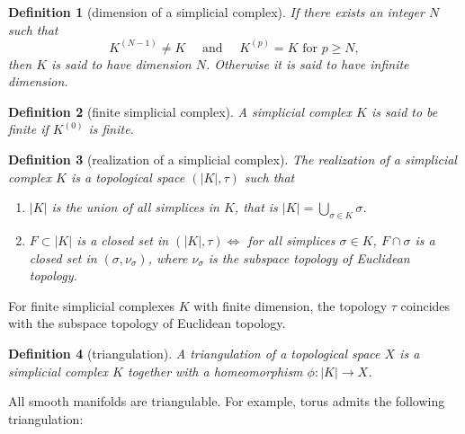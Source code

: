 \documentclass{report}
\newtheorem{definition}{Definition}[section]
\theoremstyle{nonumberplain}
\begin{document}
\begin{definition}[dimension of a simplicial complex]
If there exists an integer $N$ such that
$$
K^{(N-1)} \neq K \quad \text { and } \quad K^{(p)}=K \text { for }p\ge N ,
$$
then $K$ is said to have \emph{dimension} $N$. Otherwise it is said to have infinite dimension.
\end{definition}
\begin{definition}[finite simplicial complex]
A simplicial complex $K$ is said to be \emph{finite} if $K^{(0)}$ is finite.
\end{definition}

\begin{definition}[realization of a simplicial complex]
The realization of a simplicial complex $K$ is a topological space $(|K|, \tau)$ such that
\begin{enumerate}
	\item $|K|$ is the union of all simplices in $K$, that is $|K|=\bigcup_{\sigma\in K}\sigma$.
	\item $F\subset |K|$ is a closed set in $(|K|, \tau)\iff$ for all simplices $\sigma\in K$, $F\cap \sigma$ is a closed set in $(\sigma,\nu_\sigma)$, where $\nu_\sigma$ is the subspace topology of Euclidean topology.
\end{enumerate}
\end{definition}
For finite simplicial complexes $K$ with finite dimension, the topology $\tau$ coincides with the subspace topology of Euclidean topology. 
\begin{definition}[triangulation]
	A \emph{triangulation} of a topological space $X$ is a simplicial complex $K$ together with a homeomorphism $\phi:|K|\to X$.
\end{definition}
All smooth manifolds are triangulable. For example, torus admits the following triangulation:
\end{document}
